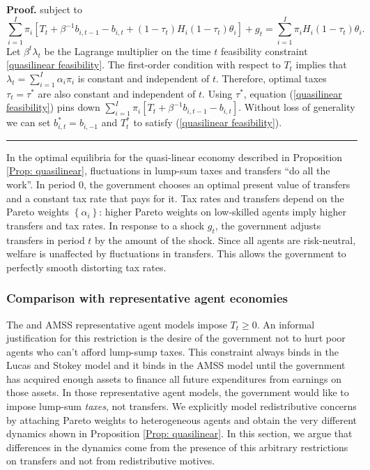 \documentclass[thmsb,11pt]{article}
\newenvironment{proof}[1][Proof]{\noindent \textbf{#1.} }{\  \rule{0.5em}{0.5em}}
\begin{document}
\begin{proof}
subject to
\begin{equation}
\sum_{i=1}^{I}\pi _{i}\left[ T_{t}+\beta ^{-1}b_{i,t-1}-b_{i,t}+\left(
1-\tau _{t}\right) H_{i}\left( 1-\tau _{t}\right)\theta_i \right] +g_{t}=%
\sum_{i=1}^{I}\pi _{i}H_{i}\left( 1-\tau _{t}\right)\theta_i .
\label{quasilinear feasibility}
\end{equation}%
Let $\beta ^{t}\lambda _{t}$ be the Lagrange multiplier on the time $t$
feasibility constraint \eqref{quasilinear feasibility}. The first-order condition with respect to $T_{t}$
implies that $\lambda _{t}=\sum_{i=1}^{I}\alpha _{i}\pi _{i}$ is constant
and independent of $t.$ Therefore, optimal taxes $\tau _{t}=\tau^{\ast }$ are
also constant and independent of $t.$  Using $\tau^{\ast}$, equation (\ref{quasilinear feasibility}) pins down $\sum_{i=1}^{I}\pi _{i}\left[ T_{t}+\beta ^{-1}b_{i,t-1}-b_{i,t}\right]$. Without loss of generality we can set $b^*_{i,t}=b_{i,-1}$ and $T^*_t$ to satisfy  (\ref{quasilinear feasibility}). %
\end{proof}

\smallskip In the optimal equilibria for the quasi-linear economy described in Proposition \ref{Prop: quasilinear}, fluctuations in lump-sum taxes and
transfers ``do all the work''. In period 0, the government chooses an optimal
present value of transfers and a constant tax rate that pays for it. Tax rates  and transfers depend on the Pareto weights $\left\{ \alpha
_{i}\right\} $:  higher Pareto weights on low-skilled agents imply
higher transfers and tax rates. In response to a shock $g_{t}$, the
government adjusts transfers in period $t$ by the amount of the shock. Since
all agents are risk-neutral,  welfare is unaffected by
fluctuations in transfers. This allows the government  to  perfectly smooth distorting tax rates.

\smallskip

\subsubsection{Comparison with representative agent economies} \label{sec: comp with AMSS}

The \cite{LucasJr.1983} and AMSS representative agent models
impose $T_{t}\geq 0$. An informal justification for this restriction is the desire of the government  not to hurt poor agents who can't afford lump-sump taxes.  This constraint always binds in the Lucas and Stokey
model and it binds in the AMSS model  until the government has acquired enough
assets to finance all future expenditures from earnings on those assets. In those
representative agent models, the government would like to impose lump-sum \emph{taxes}, not
transfers. We explicitly model redistributive concerns by attaching Pareto weights to heterogeneous agents and obtain the very different dynamics shown in Proposition \ref{Prop: quasilinear}. In this section, we argue that  differences in the dynamics come from the presence of this arbitrary restrictions on transfers and not from redistributive motives.
\end{document}
